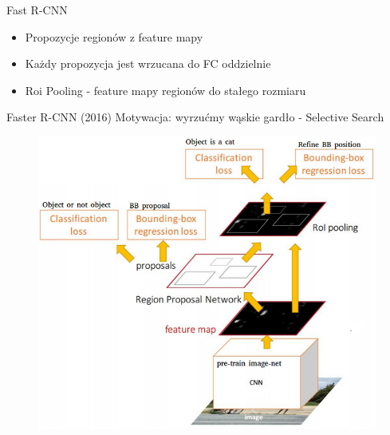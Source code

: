 \documentclass[11pt]{beamer}
\begin{document}
\begin{frame}{Fast R-CNN}
\begin{itemize}
    \item Propozycje regionów z feature mapy 
    \item Każdy propozycja jest wrzucana do FC oddzielnie
    \item Roi Pooling - feature mapy regionów do stałego rozmiaru 
\end{itemize}
\end{frame}

\begin{frame}{Faster R-CNN (2016)}
Motywacja: wyrzućmy wąskie gardło - Selective Search
\begin{figure}
    \centering
    \includegraphics[height=0.75\textheight]{grafika/fasterrcnn.png}
\end{figure}
\end{frame}
\end{document}
